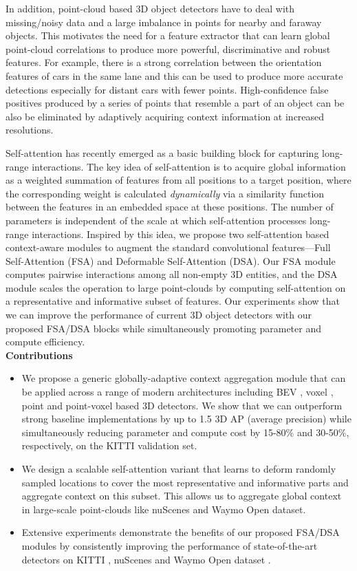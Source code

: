 \documentclass[10pt,twocolumn,letterpaper]{article}
\begin{document}
In addition, point-cloud based 3D object detectors have to deal with missing/noisy data and a large imbalance in points for nearby and faraway objects. This motivates the need for a feature extractor that can learn global point-cloud correlations to produce more powerful, discriminative and robust features. For example, there is a strong correlation between the orientation features of cars in the same lane and this can be used to produce more accurate detections especially for distant cars with fewer points. High-confidence false positives produced by a series of points that resemble a part of an object can be also be eliminated by adaptively acquiring context information at increased resolutions.

Self-attention \cite{SA} has recently emerged as a basic building block for capturing long-range interactions. The key idea of self-attention is to acquire global information as a weighted summation of features from all positions to a target position, where the corresponding weight is calculated \textit{dynamically} via a similarity function between the features in an embedded space at these positions. The number of parameters is independent of the scale at which self-attention processes long-range interactions. Inspired by this idea, we propose two self-attention based context-aware modules to augment the standard convolutional features---Full Self-Attention (FSA) and Deformable Self-Attention (DSA). Our FSA module computes pairwise interactions among all non-empty 3D entities, and the DSA module scales the operation to large point-clouds by computing self-attention on a representative and informative subset of features. Our experiments show that we can improve the performance of current 3D object detectors with our proposed FSA/DSA blocks while simultaneously promoting parameter and compute efficiency.
\vspace{0.3cm}
\\ \textbf{Contributions}
\begin{itemize}
  \item We propose a generic globally-adaptive context aggregation module that can be applied across a range of modern architectures including BEV \cite{pointpillars}, voxel \cite{SECOND}, point \cite{PointRCNN} and point-voxel \cite{PVRCNN} based 3D detectors. We show that we can outperform strong baseline implementations by up to 1.5 3D AP (average precision) while simultaneously reducing parameter and compute cost by 15-80\% and 30-50\%, respectively, on the KITTI validation set.
  \vspace{-0.4cm}
  \item We design a scalable self-attention variant that learns to deform randomly sampled locations to cover the most representative and informative parts and aggregate context on this subset. This allows us to aggregate global context in large-scale point-clouds like nuScenes and Waymo Open dataset. 
  \vspace{-0.4cm}
  \item Extensive experiments demonstrate the benefits of our proposed FSA/DSA modules by consistently improving the performance of state-of-the-art detectors on KITTI \cite{KITTI}, nuScenes \cite{nuscenes} and Waymo Open dataset \cite{waymo}.
\end{itemize}
\end{document}
